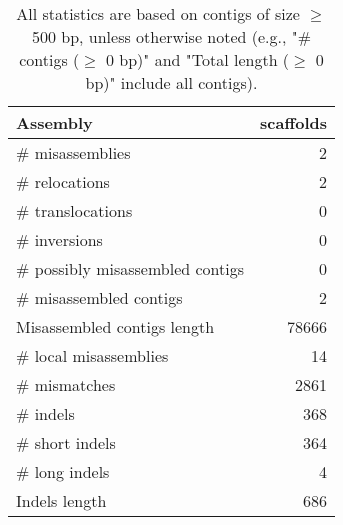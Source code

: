 \documentclass[12pt,a4paper]{article}
\begin{document}
\begin{table}[ht]
\begin{center}
\caption{All statistics are based on contigs of size $\geq$ 500 bp, unless otherwise noted (e.g., "\# contigs ($\geq$ 0 bp)" and "Total length ($\geq$ 0 bp)" include all contigs).}
\begin{tabular}{|l*{1}{|r}|}
\hline
Assembly & scaffolds \\ \hline
\# misassemblies & 2 \\ \hline
\hspace{5mm}\# relocations & 2 \\ \hline
\hspace{5mm}\# translocations & 0 \\ \hline
\hspace{5mm}\# inversions & 0 \\ \hline
\# possibly misassembled contigs & 0 \\ \hline
\# misassembled contigs & 2 \\ \hline
Misassembled contigs length & 78666 \\ \hline
\# local misassemblies & 14 \\ \hline
\# mismatches & 2861 \\ \hline
\# indels & 368 \\ \hline
\hspace{5mm}\# short indels & 364 \\ \hline
\hspace{5mm}\# long indels & 4 \\ \hline
Indels length & 686 \\ \hline
\end{tabular}
\end{center}
\end{table}
\end{document}
